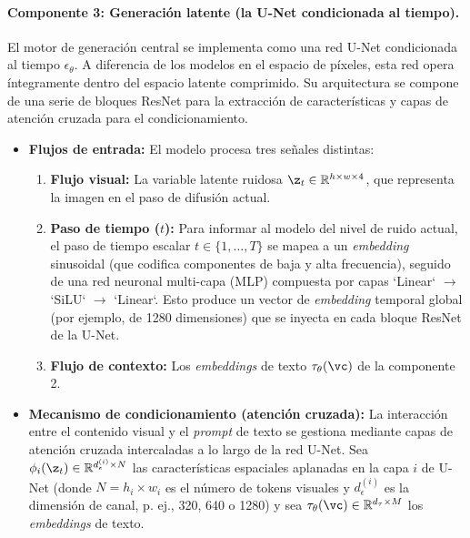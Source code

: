 \documentclass[../../book-main_es.tex]{subfiles}
\begin{document}
\paragraph{Componente 3: Generación latente (la U-Net condicionada al tiempo).}
El motor de generación central se implementa como una red U-Net condicionada al tiempo 
$\epsilon_\theta$. A diferencia de los modelos en el espacio de píxeles, esta red opera 
íntegramente dentro del espacio latente comprimido. Su arquitectura se compone de una serie 
de bloques ResNet para la extracción de características y capas de atención cruzada para el 
condicionamiento.
\begin{itemize}
    \item \textbf{Flujos de entrada:} El modelo procesa tres señales distintas:
    \begin{enumerate}
        \item \textbf{Flujo visual:} La variable latente ruidosa $\z_t \in \mathbb{R}^{h \times w \times 4}$, 
              que representa la imagen en el paso de difusión actual.
        \item \textbf{Paso de tiempo ($t$):} Para informar al modelo del nivel de ruido actual, el paso 
              de tiempo escalar $t \in \{1, \dots, T\}$ se mapea a un \textit{embedding} sinusoidal (que codifica 
              componentes de baja y alta frecuencia), seguido de una red neuronal multi-capa (MLP) compuesta por 
              capas `Linear` $\to$ `SiLU` $\to$ `Linear`. Esto produce un vector de \textit{embedding} temporal global 
              (por ejemplo, de 1280 dimensiones) que se inyecta en cada bloque ResNet de la U-Net.
        \item \textbf{Flujo de contexto:} Los \textit{embeddings} de texto $\tau_\theta(\vc)$ de la componente 2.
    \end{enumerate}

    \item \textbf{Mecanismo de condicionamiento (atención cruzada):} La interacción entre el contenido visual y el 
          \textit{prompt} de texto se gestiona mediante capas de atención cruzada intercaladas a lo largo de la red U-Net. 
          Sea $\phi_i(\z_t) \in \mathbb{R}^{d_\epsilon^{(i)} \times N}$ las características espaciales aplanadas en 
          la capa $i$ de U-Net (donde $N = h_i \times w_i$ es el número de tokens visuales y $d_\epsilon^{(i)}$ es 
          la dimensión de canal, p. ej., 320, 640 o 1280) y sea $\tau_\theta(\vc) \in \mathbb{R}^{d_\tau \times M}$ 
          los \textit{embeddings} de texto.


\end{itemize}
\end{document}
